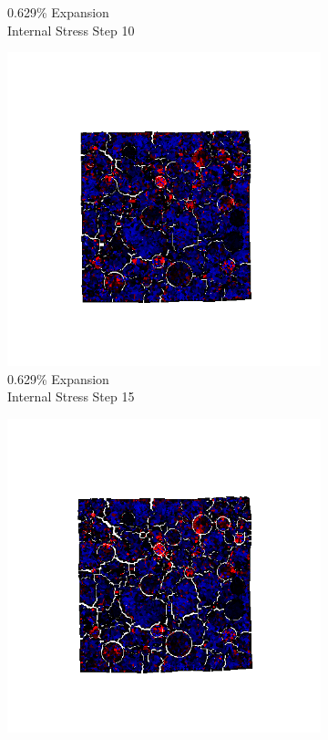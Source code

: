\begin{figure}[ht!]
\begin{subfigure}{.25\textwidth}
      \caption{0.629\% Expansion\\Internal Stress Step 10}
    \end{subfigure}%
    \begin{subfigure}{.25\textwidth}
      \centering
      \includegraphics[width=1.0\linewidth]{Files/exp_3D/ASR/A15P75_4_s15.png}
      \caption{0.629\% Expansion\\Internal Stress Step 15}
    \end{subfigure}%
    \begin{subfigure}{.25\textwidth}
      \centering
      \includegraphics[width=1.0\linewidth]{Files/exp_3D/ASR/A15P75_4_stress.png}

\end{subfigure}
\end{figure}
